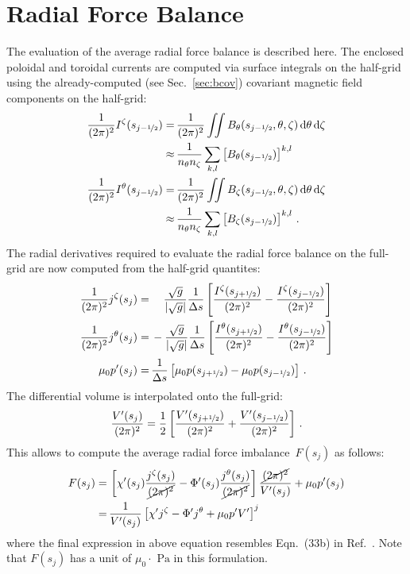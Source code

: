 \section{Radial Force Balance}
The evaluation of the average radial force balance is described here.
The enclosed poloidal and toroidal currents are computed via surface integrals on the half-grid
using the already-computed (see Sec.~\ref{sec:bcov}) covariant magnetic field components on the half-grid:
\begin{align}
  \frac{1}{(2 \pi)^2}  I^\zeta(s_{j-\nicefrac{1}{2}}) =&\, \frac{1}{(2 \pi)^2} \iint B_\theta(s_{j-\nicefrac{1}{2}}, \theta, \zeta) \,\mathrm{d}\theta \,\mathrm{d}\zeta \nonumber \\
                            \approx&\, \frac{1}{n_\theta n_\zeta} \sum\limits_{k,l} \left[ B_\theta(s_{j-\nicefrac{1}{2}}) \right]^{k,l} \\
  \frac{1}{(2 \pi)^2} I^\theta(s_{j-\nicefrac{1}{2}}) =&\, \frac{1}{(2 \pi)^2} \iint  B_\zeta(s_{j-\nicefrac{1}{2}}, \theta, \zeta) \,\mathrm{d}\theta \,\mathrm{d}\zeta \nonumber \\
                            \approx&\, \frac{1}{n_\theta n_\zeta} \sum\limits_{k,l} \left[  B_\zeta(s_{j-\nicefrac{1}{2}}) \right]^{k,l} \, .
\end{align}
The radial derivatives required to evaluate the radial force balance on the full-grid
are now computed from the half-grid quantites:
\begin{align}
  \frac{1}{(2 \pi)^2}  j^\zeta(s_j) =&\, \phantom{-}~ \frac{\sqrt{g}}{|\sqrt{g}|} \frac{1}{\Delta s} \left[ \frac{ I^\zeta(s_{j+\nicefrac{1}{2}})}{(2 \pi)^2} - \frac{ I^\zeta(s_{j-\nicefrac{1}{2}})}{(2 \pi)^2} \right] \\
  \frac{1}{(2 \pi)^2} j^\theta(s_j) =&\,          -   \frac{\sqrt{g}}{|\sqrt{g}|} \frac{1}{\Delta s} \left[ \frac{I^\theta(s_{j+\nicefrac{1}{2}})}{(2 \pi)^2} - \frac{I^\theta(s_{j-\nicefrac{1}{2}})}{(2 \pi)^2} \right] \\
  \mu_0 p'(s_j) =&\, \frac{1}{\Delta s} \left[ \mu_0 p(s_{j+\nicefrac{1}{2}}) - \mu_0 p(s_{j-\nicefrac{1}{2}}) \right] \, .
\end{align}
The differential volume is interpolated onto the full-grid:
\begin{equation}
  \frac{V'(s_j)}{(2 \pi)^2} = \frac{1}{2} \left[ \frac{V'(s_{j+\nicefrac{1}{2}})}{(2 \pi)^2} + \frac{V'(s_{j-\nicefrac{1}{2}})}{(2 \pi)^2} \right] \, .
\end{equation}
This allows to compute the average radial force imbalance~$F(s_j)$ as follows:
\begin{align}
  F(s_j) =&\,   \left[   \chi'(s_j) \frac{ j^\zeta(s_j)}{\cancel{(2 \pi)^2}}
                       - \Phi'(s_j) \frac{j^\theta(s_j)}{\cancel{(2 \pi)^2}} \right] \frac{\cancel{(2 \pi)^2}}{V'(s_j)}
              + \mu_0 p'(s_j) \nonumber \\
         =&\,   \frac{1}{V'(s_j)} \left[ \chi' j^\zeta - \Phi' j^\theta + \mu_0 p' V' \right]^j
\end{align}
where the final expression in above equation resembles Eqn.~(33b) in Ref.~\cite{hirshman_whitson_1983}.
Note that $F(s_j)$ has a unit of $\mu_0 \cdot \textrm{ Pa}$ in this formulation.

